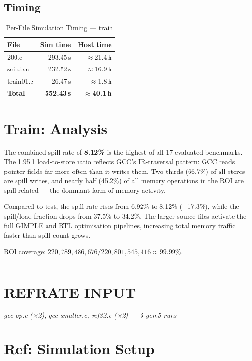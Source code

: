 \documentclass[conference]{IEEEtran}
\newcommand{\inputpart}[2]{%
    \vspace{1em}
    \noindent\rule{\linewidth}{0.4pt}
    \section{#1}
    \textit{#2}
    \vspace{0.2em}
}
\begin{document}
\subsection{Timing}

\begin{table}[H]
\centering
\caption{Per-File Simulation Timing --- train}
\label{tab:train_timing}
\begin{tabular}{lrr}
\toprule
\textbf{File} & \textbf{Sim time} & \textbf{Host time} \\
\midrule
200.c     & 293.45\,s & $\approx$21.4\,h \\
scilab.c  & 232.52\,s & $\approx$16.9\,h \\
train01.c &  26.47\,s &  $\approx$1.8\,h \\
\midrule
\textbf{Total} & \textbf{552.43\,s} & \textbf{$\approx$40.1\,h} \\
\bottomrule
\end{tabular}
\end{table}

\section{Train: Analysis}

The combined spill rate of \textbf{8.12\%} is the highest of all
17 evaluated benchmarks. The 1.95:1 load-to-store ratio reflects
GCC's IR-traversal pattern: GCC reads pointer fields far more often
than it writes them. Two-thirds (66.7\%) of all stores are spill
writes, and nearly half (45.2\%) of all memory operations in the
ROI are spill-related --- the dominant form of memory activity.

Compared to test, the spill rate rises from 6.92\% to 8.12\%
(+17.3\%), while the spill/load fraction drops from 37.5\% to
34.2\%. The larger source files activate the full GIMPLE and RTL
optimisation pipelines, increasing total memory traffic faster
than spill count grows.

ROI coverage: $220{,}789{,}486{,}676 / 220{,}801{,}545{,}416
\approx \mathbf{99.99\%}$.

\inputpart{REFRATE INPUT}{gcc-pp.c (×2), gcc-smaller.c, ref32.c (×2) --- 5 gem5 runs}

\section{Ref: Simulation Setup}
\end{document}
